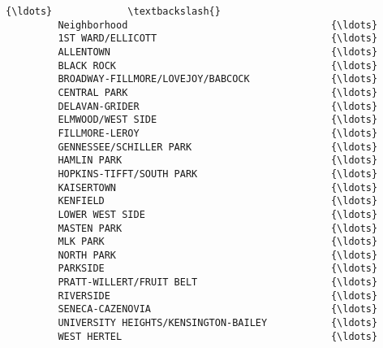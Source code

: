 \documentclass[11pt]{article}
\begin{document}
\begin{Verbatim}[commandchars=\\\{\}]
                                                        {\ldots}             \textbackslash{}
         Neighborhood                                   {\ldots}              
         1ST WARD/ELLICOTT                              {\ldots}              
         ALLENTOWN                                      {\ldots}              
         BLACK ROCK                                     {\ldots}              
         BROADWAY-FILLMORE/LOVEJOY/BABCOCK              {\ldots}              
         CENTRAL PARK                                   {\ldots}              
         DELAVAN-GRIDER                                 {\ldots}              
         ELMWOOD/WEST SIDE                              {\ldots}              
         FILLMORE-LEROY                                 {\ldots}              
         GENNESSEE/SCHILLER PARK                        {\ldots}              
         HAMLIN PARK                                    {\ldots}              
         HOPKINS-TIFFT/SOUTH PARK                       {\ldots}              
         KAISERTOWN                                     {\ldots}              
         KENFIELD                                       {\ldots}              
         LOWER WEST SIDE                                {\ldots}              
         MASTEN PARK                                    {\ldots}              
         MLK PARK                                       {\ldots}              
         NORTH PARK                                     {\ldots}              
         PARKSIDE                                       {\ldots}              
         PRATT-WILLERT/FRUIT BELT                       {\ldots}              
         RIVERSIDE                                      {\ldots}              
         SENECA-CAZENOVIA                               {\ldots}              
         UNIVERSITY HEIGHTS/KENSINGTON-BAILEY           {\ldots}              
         WEST HERTEL                                    {\ldots}              
         

\end{Verbatim}
\end{document}
